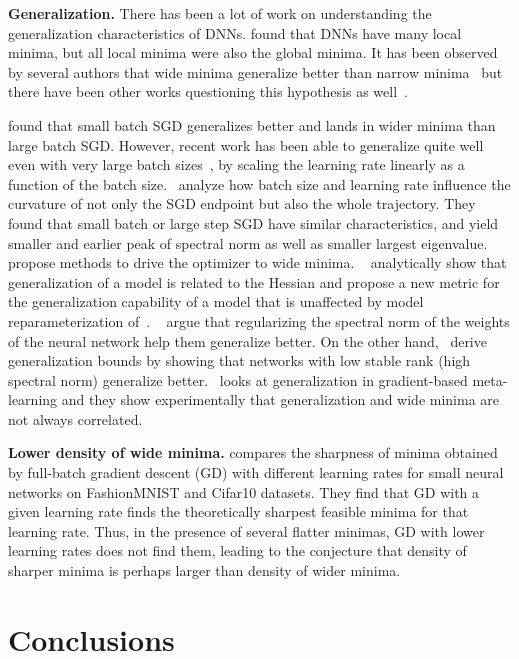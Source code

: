 \documentclass{article} \usepackage{iclr2021_conference,times}
\begin{document}
\noindent
{\bf Generalization.}
There has been a lot of work on understanding the generalization characteristics of DNNs. \citet{kawaguchi2016deep} found that DNNs have many local minima, but all local minima were also the global minima. It has been observed by several authors that wide minima generalize better than narrow minima~\citep{arora2018stronger,hochreiter1997flat,keskar2016large,jastrzkebski2017three,wang2018identifying} but there have been other works questioning this hypothesis as well~\citep{dinh2017sharp,golatkar2019time,guiroy2019towards,jastrzebski_iclr_2019,yoshida2017spectral}.

\citet{keskar2016large} found that small batch SGD generalizes better and lands in wider minima than large batch SGD. However, recent work has been able to generalize quite well even with very large batch sizes~\citep{goyal-imagenet-in-an-hour-2017,large-batch-training-openai-2018,large-batch-training-google-2018}, by scaling the learning rate linearly as a function of the batch size.~\citet{jastrzebski_iclr_2019}
analyze how batch size and learning rate influence the curvature of not only the SGD endpoint but also the whole trajectory. They found that small batch or large step SGD have similar characteristics, and yield smaller and earlier peak of spectral norm as well as smaller largest eigenvalue.~\citet{chaudhari2019entropy,shapinglandscape2019baldassi} propose methods to drive the optimizer to wide minima. ~\citet{wang2018identifying} analytically show that generalization of a model is related to the Hessian and propose a new metric for the generalization capability of a model that is unaffected by model reparameterization of~\citet{dinh2017sharp}. ~\citet{yoshida2017spectral} argue that regularizing the spectral norm of the weights of the neural network help them generalize better. On the other hand,~\citet{arora2018stronger} derive generalization bounds by showing that networks with low stable rank (high spectral norm) generalize better.~\citet{guiroy2019towards} looks at generalization in gradient-based meta-learning and they show experimentally that generalization and wide minima are not always correlated. 



\noindent
{\bf Lower density of wide minima.} \citet{wu2018sgd} compares the sharpness of minima obtained by full-batch gradient descent (GD) with different learning rates for small neural networks on FashionMNIST and Cifar10 datasets. They find that GD with a given learning rate finds the theoretically sharpest feasible minima for that learning rate. Thus, in the presence of several flatter minimas, GD with lower learning rates does not find them, leading to the conjecture that density of sharper minima is perhaps larger than density of wider minima. \section{Conclusions} \label{sec:conclusions}
\end{document}
